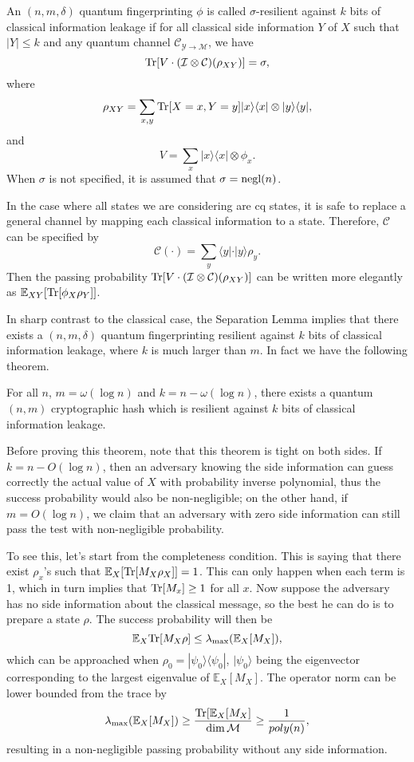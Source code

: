 \begin{definition}
    An $(n,m,\delta)$ quantum fingerprinting $\phi$ is called $\sigma$-resilient against $k$ bits of classical information leakage if for all classical side information $Y$ of $X$ such that $|Y|\leq k$ and any quantum channel $\mathcal{C}_{\mathcal{Y}\rightarrow \mathcal{M}}$, we have
            $$\textnormal{Tr}[V\cdot (\mathcal{I}\otimes\mathcal{C})(\rho_{XY})]=\sigma,$$
            where $$\rho_{XY}=\sum_{x,y}\textnormal{Tr}[X=x,Y=y]|x\rangle\langle x|\otimes |y\rangle\langle y|,$$
            and $$V=\sum_{x}|x\rangle\langle x|\otimes \phi_x.$$
            When $\sigma$ is not specified, it is assumed that $\sigma=\text{negl}(n)$.
\end{definition}

In the case where all states we are considering are cq states, it is safe to replace a general channel by mapping each classical information to a state. Therefore,  $\mathcal{C}$ can be specified by
$$\mathcal{C}(\cdot)=\sum_y\langle y|\cdot| y\rangle\rho_y.$$
Then the passing probability $\textnormal{Tr}[V\cdot (\mathcal{I}\otimes\mathcal{C})(\rho_{XY})]$ can be written more elegantly as $\mathbb{E}_{XY}[\textnormal{Tr}[\phi_X\rho_Y]]$.

In sharp contrast to the classical case, the Separation Lemma implies that there exists a $(n,m,\delta)$ quantum fingerprinting resilient against $k$ bits of classical information leakage, where $k$ is much larger than $m$. In fact we have the following theorem.


\begin{theorem}\label{thm:main_exist}
    For all $n$, $m=\omega(\log n)$ and $k=n-\omega(\log n)$, there exists a quantum $(n,m)$ cryptographic hash which is resilient against $k$ bits of classical information leakage.
\end{theorem}

Before proving this theorem, note that this theorem is tight on both sides. If $k=n-O(\log n)$, then an adversary knowing the side information can guess correctly the actual value of $X$ with probability inverse polynomial, thus the success probability would also be non-negligible; on the other hand, if $m=O(\log n)$, we claim that an adversary with zero side information can still pass the test with non-negligible probability. 

To see this, let's start from the completeness condition. This is saying that there exist $\rho_x$'s such that $\mathbb{E}_X[\textnormal{Tr}[M_X\rho_X]]=1$. This can only happen when each term is 1, which in turn implies that $\textnormal{Tr}[M_x]\geq 1$ for all $x$. Now suppose the adversary has no side information about the classical message, so the best he can do is to prepare a state $\rho$. The success probability will then be $$\mathbb{E}_X\textnormal{Tr}[M_X\rho]\leq \lambda_{\max}(\mathbb{E}_X[M_X]),$$
which can be approached when $\rho_0=|\psi_0\rangle\langle \psi_0|$, $|\psi_0\rangle$ being the eigenvector corresponding to the largest eigenvalue of $\mathbb{E}_X[M_X]$. The operator norm can be lower bounded from the trace by 
$$\lambda_{\max}(\mathbb{E}_X[M_X])\geq \frac{\textnormal{Tr}[\mathbb{E}_X[M_X]}{\dim \mathcal{M}}\geq\frac{1}{poly(n)},$$
resulting in a non-negligible passing probability without any side information.

